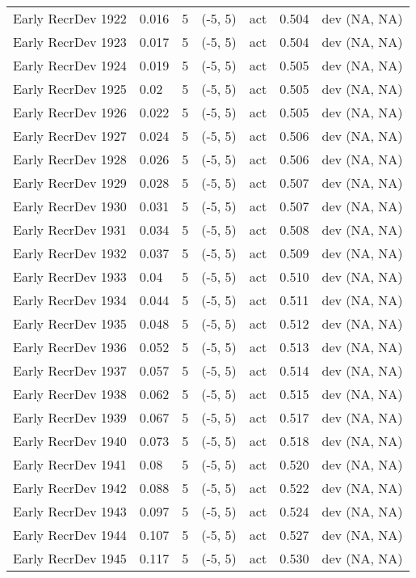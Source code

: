 \documentclass[11pt,
  english,
  letterpaper,
]{article}
\begin{document}
\begin{landscape}
\begin{longtable}[t]{>{\raggedright\arraybackslash}p{7.5cm}lllll>{\raggedright\arraybackslash}p{3.5cm}}
Early RecrDev 1922 & 0.016 & 5 & (-5, 5) & act & 0.504 & dev (NA, NA)\\
Early RecrDev 1923 & 0.017 & 5 & (-5, 5) & act & 0.504 & dev (NA, NA)\\
Early RecrDev 1924 & 0.019 & 5 & (-5, 5) & act & 0.505 & dev (NA, NA)\\
Early RecrDev 1925 & 0.02 & 5 & (-5, 5) & act & 0.505 & dev (NA, NA)\\
Early RecrDev 1926 & 0.022 & 5 & (-5, 5) & act & 0.505 & dev (NA, NA)\\
Early RecrDev 1927 & 0.024 & 5 & (-5, 5) & act & 0.506 & dev (NA, NA)\\
Early RecrDev 1928 & 0.026 & 5 & (-5, 5) & act & 0.506 & dev (NA, NA)\\
Early RecrDev 1929 & 0.028 & 5 & (-5, 5) & act & 0.507 & dev (NA, NA)\\
Early RecrDev 1930 & 0.031 & 5 & (-5, 5) & act & 0.507 & dev (NA, NA)\\
Early RecrDev 1931 & 0.034 & 5 & (-5, 5) & act & 0.508 & dev (NA, NA)\\
Early RecrDev 1932 & 0.037 & 5 & (-5, 5) & act & 0.509 & dev (NA, NA)\\
Early RecrDev 1933 & 0.04 & 5 & (-5, 5) & act & 0.510 & dev (NA, NA)\\
Early RecrDev 1934 & 0.044 & 5 & (-5, 5) & act & 0.511 & dev (NA, NA)\\
Early RecrDev 1935 & 0.048 & 5 & (-5, 5) & act & 0.512 & dev (NA, NA)\\
Early RecrDev 1936 & 0.052 & 5 & (-5, 5) & act & 0.513 & dev (NA, NA)\\
Early RecrDev 1937 & 0.057 & 5 & (-5, 5) & act & 0.514 & dev (NA, NA)\\
Early RecrDev 1938 & 0.062 & 5 & (-5, 5) & act & 0.515 & dev (NA, NA)\\
Early RecrDev 1939 & 0.067 & 5 & (-5, 5) & act & 0.517 & dev (NA, NA)\\
Early RecrDev 1940 & 0.073 & 5 & (-5, 5) & act & 0.518 & dev (NA, NA)\\
Early RecrDev 1941 & 0.08 & 5 & (-5, 5) & act & 0.520 & dev (NA, NA)\\
Early RecrDev 1942 & 0.088 & 5 & (-5, 5) & act & 0.522 & dev (NA, NA)\\
Early RecrDev 1943 & 0.097 & 5 & (-5, 5) & act & 0.524 & dev (NA, NA)\\
Early RecrDev 1944 & 0.107 & 5 & (-5, 5) & act & 0.527 & dev (NA, NA)\\
Early RecrDev 1945 & 0.117 & 5 & (-5, 5) & act & 0.530 & dev (NA, NA)\\

\end{longtable}
\end{landscape}
\end{document}
